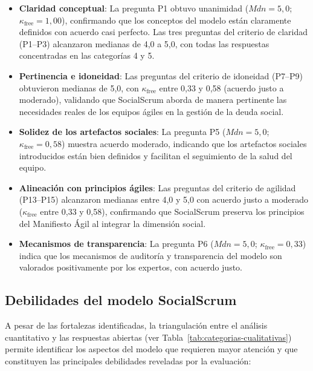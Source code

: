\begin{itemize}
   \item \textbf{Claridad conceptual}: La pregunta P1 obtuvo unanimidad ($Mdn = 5{,}0$; $\kappa_{\text{free}} = 1{,}00$), confirmando que los conceptos del modelo están claramente definidos con acuerdo casi perfecto. Las tres preguntas del criterio de claridad (P1--P3) alcanzaron medianas de 4,0 a 5,0, con todas las respuestas concentradas en las categorías 4 y 5.
   \item \textbf{Pertinencia e idoneidad}: Las preguntas del criterio de idoneidad (P7--P9) obtuvieron medianas de 5,0, con $\kappa_{\text{free}}$ entre 0,33 y 0,58 (acuerdo justo a moderado), validando que SocialScrum aborda de manera pertinente las necesidades reales de los equipos ágiles en la gestión de la deuda social.
   \item \textbf{Solidez de los artefactos sociales}: La pregunta P5 ($Mdn = 5{,}0$; $\kappa_{\text{free}} = 0{,}58$) muestra acuerdo moderado, indicando que los artefactos sociales introducidos están bien definidos y facilitan el seguimiento de la salud del equipo.
   \item \textbf{Alineación con principios ágiles}: Las preguntas del criterio de agilidad (P13--P15) alcanzaron medianas entre 4,0 y 5,0 con acuerdo justo a moderado ($\kappa_{\text{free}}$ entre 0,33 y 0,58), confirmando que SocialScrum preserva los principios del Manifiesto Ágil al integrar la dimensión social.
   \item \textbf{Mecanismos de transparencia}: La pregunta P6 ($Mdn = 5{,}0$; $\kappa_{\text{free}} = 0{,}33$) indica que los mecanismos de auditoría y transparencia del modelo son valorados positivamente por los expertos, con acuerdo justo.
\end{itemize}



\subsection{Debilidades del modelo SocialScrum}
A pesar de las fortalezas identificadas, la triangulación entre el análisis cuantitativo y las respuestas abiertas (ver Tabla~\ref{tab:categorias-cualitativas}) permite identificar los aspectos del modelo que requieren mayor atención y que constituyen las principales debilidades reveladas por la evaluación:

